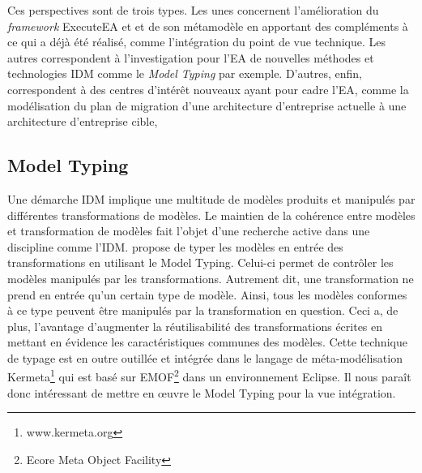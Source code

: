 Ces perspectives sont de trois types. Les unes concernent l'amélioration du \emph{framework} ExecuteEA et 
et de son métamodèle en apportant des compléments à ce qui a déjà été réalisé, comme l'intégration
du point de vue technique. Les autres correspondent à l'investigation pour l'EA
de nouvelles méthodes et technologies IDM comme le \emph{Model Typing} par exemple. D'autres, enfin,
correspondent à des centres d'intérêt nouveaux ayant pour cadre l'EA, comme la modélisation du plan de migration
d'une architecture d'entreprise actuelle à une architecture d'entreprise cible, 



    \subsection{Model Typing}


Une démarche IDM implique une multitude de modèles produits et manipulés par différentes transformations de modèles. Le maintien de la cohérence entre modèles et transformation de modèles fait l'objet d'une recherche active dans une discipline comme l'IDM. \cite{steel2007model} propose de typer les modèles en entrée des transformations en utilisant le Model Typing. Celui-ci permet de contrôler les modèles manipulés par les transformations. Autrement dit, une transformation ne prend en entrée qu'un certain type de modèle. Ainsi, tous les modèles conformes à ce type peuvent être manipulés par la transformation en question. Ceci a, de plus, l'avantage d'augmenter la réutilisabilité des transformations écrites en mettant en évidence les caractéristiques communes des modèles. Cette technique de typage est en outre outillée et intégrée dans le langage de méta-modélisation Kermeta\footnote{www.kermeta.org} qui est basé sur EMOF\footnote{Ecore Meta Object Facility} dans un environnement Eclipse. Il nous paraît donc intéressant de mettre en œuvre le Model Typing pour la vue intégration.

